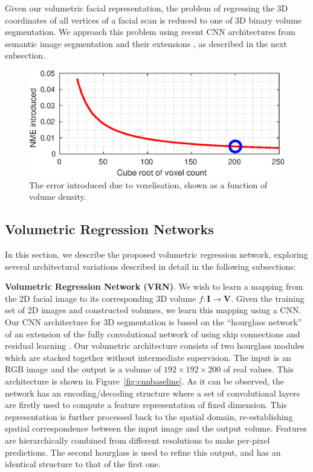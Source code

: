 Given our volumetric facial representation, the problem of regressing
the 3D coordinates of all vertices of a facial scan is reduced to one
of 3D binary volume segmentation. We approach this problem using
recent CNN architectures from semantic image segmentation
\cite{long2015fully} and their extensions \cite{newell2016stacked}, as
described in the next subsection.

\begin{figure}
  \centering
  \includegraphics[width=0.9\linewidth]{curves/voxerror.eps}
  \caption[Error due to voxelisation]{The error introduced due to
    voxelisation, shown as a function of volume density.}
  \label{fig:voxerror}
\end{figure}

\subsection{Volumetric Regression Networks}


In this section, we describe the proposed volumetric regression
network, exploring several architectural variations described in
detail in the following subsections:

\textbf{Volumetric Regression Network (VRN)}. We wish to learn a
mapping from the 2D facial image to its corresponding 3D volume
$f: \mathbf{I} \rightarrow \mathbf{V}$. Given the training set of 2D
images and constructed volumes, we learn this mapping using a CNN. Our
CNN architecture for 3D segmentation is based on the ``hourglass
network'' of \cite{newell2016stacked} an extension of the fully
convolutional network of \cite{long2015fully} using skip connections
and residual learning \cite{he2015deep}. Our volumetric architecture
consists of two hourglass modules which are stacked together without
intermediate supervision. The input is an RGB image and the output is
a volume of $192\times 192\times 200$ of real values. This
architecture is shown in Figure~\ref{fig:cnnbaseline}. As it can be
observed, the network has an encoding/decoding structure where a set
of convolutional layers are firstly used to compute a feature
representation of fixed dimension. This representation is further
processed back to the spatial domain, re-establishing spatial
correspondence between the input image and the output volume. Features
are hierarchically combined from different resolutions to make
per-pixel predictions. The second hourglass is used to refine this
output, and has an identical structure to that of the first one.

